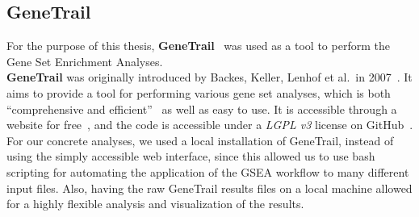 \subsection{GeneTrail}\label{subsec:td_genetrail}
For the purpose of this thesis, \textbf{GeneTrail}~\cite{genetrail,genetrail_original} was used as a tool to perform the Gene Set Enrichment Analyses.\\
\textbf{GeneTrail} was originally introduced by Backes, Keller, Lenhof et al.\ in 2007~\cite{genetrail_original}. It aims to provide a tool for performing various gene set analyses, which is both ``comprehensive and efficient''~\cite{genetrail_original} as well as easy to use. It is accessible through a website for free~\cite{genetrail}, and the code is accessible under a \textit{LGPL v3} license on GitHub~\cite{genetrail_github}.\\
For our concrete analyses, we used a local installation of GeneTrail, instead of using the simply accessible web interface, since this allowed us to use bash scripting for automating the application of the GSEA workflow to many different input files. Also, having the raw GeneTrail results files on a local machine allowed for a highly flexible analysis and visualization of the results.

